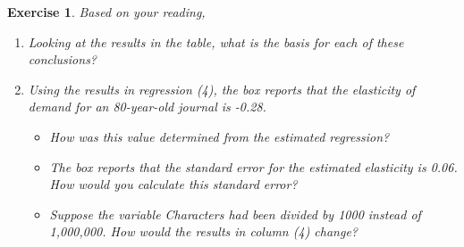 \documentclass{article}
\newtheorem{exercise}[theorem]{Exercise}
\begin{document}
\begin{exercise}
Based on your reading,
\begin{enumerate}[label=(\alph*)]
\item Looking at the results in the table, what is the basis for each of these conclusions?
\item  Using the results in regression (4), the box reports that the elasticity of demand for an 80-year-old journal is -0.28.
\begin{itemize}
    \item  How was this value determined from the estimated regression?
    \item The box reports that the standard error for the estimated elasticity is 0.06. How would you calculate this standard error?
    \item Suppose the variable Characters had been divided by 1000 instead of 1,000,000. How would the results in column (4) change?
\end{itemize}
\end{enumerate}
\end{exercise}
\end{document}
